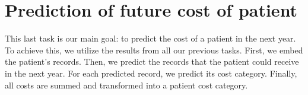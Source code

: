 



\section{Prediction of future cost of patient}
\label{pat_fut_pred_met}

This last task is our main goal: to predict the cost of a patient in the next year. To achieve this, we utilize the results from all our previous tasks. First, we embed the patient’s records. Then, we predict the records that the patient could receive in the next year. For each predicted record, we predict its cost category. Finally, all costs are summed and transformed into a patient cost category.
